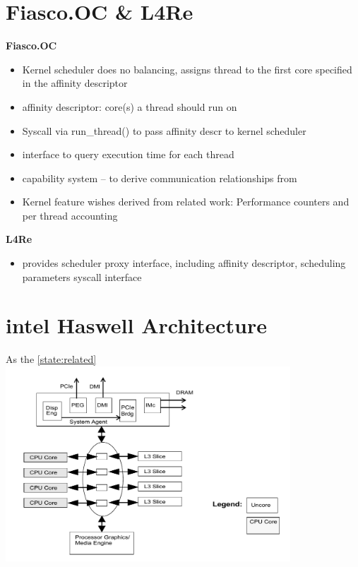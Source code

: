\section{Fiasco.OC \& L4Re}
\label{state:env}

\textbf{Fiasco.OC}
\begin{itemize}
  \item Kernel scheduler does no balancing, assigns thread to the first
    core specified in the affinity descriptor
  \item affinity descriptor: core(s) a thread should run on
  \item Syscall via run\_thread() to pass affinity descr to kernel scheduler
  \item interface to query execution time for each thread
  \item capability system -- to derive communication relationships from
  \item	Kernel feature wishes derived from related work: Performance counters
    and per thread accounting
\end{itemize}

\textbf{L4Re}
\begin{itemize}
  \item provides scheduler proxy interface, including affinity descriptor,
    scheduling parameters
  \tiem syscall interface
\end{itemize}



\section{\gls{intel} Haswell Architecture}
\label{state:haswell}

As the \ref{state:related}
\includegraphics[width=0.8\textwidth]{images/haswell_architecture_by_intel_large}

